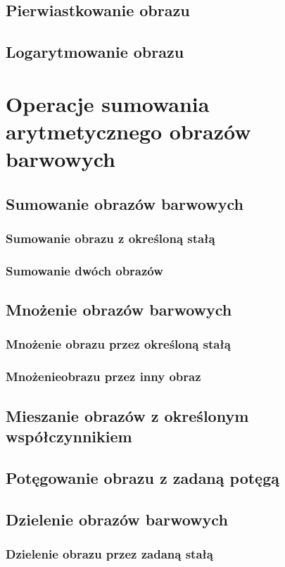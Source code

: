 \documentclass[a4paper,12pt, titlepage]{report}
\begin{document}
\section{Pierwiastkowanie obrazu}
\section{Logarytmowanie obrazu}

\chapter{Operacje sumowania arytmetycznego obrazów barwowych}
\section{Sumowanie obrazów barwowych}
\subsection{Sumowanie obrazu z określoną stałą}
\subsection{Sumowanie dwóch obrazów}
\section{Mnożenie obrazów barwowych}
\subsection{Mnożenie obrazu przez określoną stałą}
\subsection{Mnożenieobrazu przez inny obraz}
\section{Mieszanie obrazów z określonym współczynnikiem}
\section{Potęgowanie obrazu z zadaną potęgą}
\section{Dzielenie obrazów barwowych}
\subsection{Dzielenie obrazu przez zadaną stałą}
\end{document}
